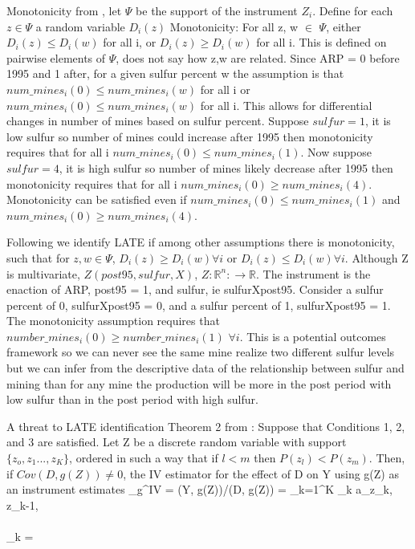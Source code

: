 \documentclass{article}
\begin{document}
Monotonicity from \cite{angrist1994identification}, let $\Psi$ be the support of the instrument $Z_i$. Define for each $z \in \Psi$ a random variable $D_i(z)$
Monotonicity: For all z, w $\in$ $\Psi$, either $D_i(z) \leq D_i(w)$ for all i, or $D_i(z) \geq D_i(w)$ for all i. This is defined on pairwise elements of $\Psi$, does not say how z,w are related.
Since ARP = 0 before 1995 and 1 after, for a given sulfur percent w the assumption is that $num\_mines_i(0) \leq num\_mines_i(w)$ for all i or $num\_mines_i(0) \leq num\_mines_i(w)$ for all i. This allows for differential changes in number of mines based on sulfur percent. Suppose $sulfur= 1$, it is low sulfur so number of mines could increase after 1995 then monotonicity requires that for all i $num\_mines_i(0) \leq num\_mines_i(1)$. Now suppose $sulfur = 4$, it is high sulfur so number of mines likely decrease after 1995 then monotonicity requires that for all i $num\_mines_i(0) \geq num\_mines_i(4)$. Monotonicity can be satisfied even if $num\_mines_i(0) \leq num\_mines_i(1)$ and $num\_mines_i(0) \geq num\_mines_i(4)$.

Following \cite{angrist1995identification} we identify LATE if among other assumptions there is monotonicity, such that for $ z,w\in \Psi$, $D_i(z)\geq D_i(w) \forall i$ or $D_i(z)\leq D_i(w) \forall i$. Although Z is multivariate, $Z(post95,sulfur, X)$, $Z:\mathbb{R}^n:\rightarrow\mathbb{R}$. The instrument is the enaction of ARP, post95 = 1, and sulfur, ie sulfurXpost95. Consider a sulfur percent of 0, sulfurXpost95 = 0, and a sulfur percent of 1, sulfurXpost95 = 1. The monotonicity assumption requires that $number\_mines_i(0) \geq number\_mines_i(1)$ $\forall i$. This is a potential outcomes framework so we can never see the same mine realize two different sulfur levels but we can infer from the descriptive data of the relationship between sulfur and mining than for any mine the production will be more in the post period with low sulfur than in the post period with high sulfur.

A threat to LATE identification Theorem 2 from \cite{angrist1994identification}: Suppose that Conditions 1, 2, and 3 are satisfied. Let Z be a discrete random variable with support $\{z_o, z_1. . .  ,z_K\}$, ordered in such a way that if $l <
m$ then $P(z_l) <P(z_m)$. Then, if $Cov(D, g(Z)) \neq 0$, the IV estimator for the effect of D on Y using g(Z) as an instrument estimates
    \alpha_g^{IV} = (Y, g(Z))/(D, g(Z)) = \sum_{k=1}^{K} \lambda_k \cdot a_{z_k, z_{k-1}}, \\
 \\
\lambda_k = 
\end{document}
